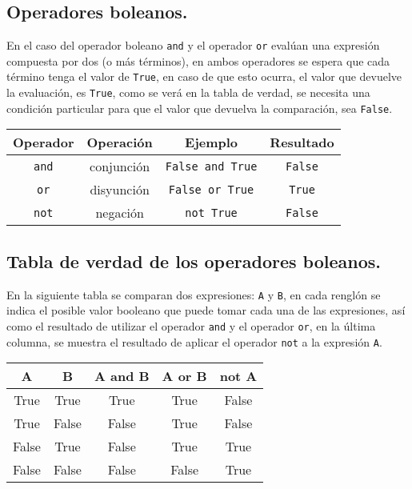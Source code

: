 \documentclass[11pt]{article}
\begin{document}
\subsection{Operadores boleanos.}\label{operadores-boleanos}
En el caso del operador boleano \texttt{and} y el operador \texttt{or} evalúan una expresión compuesta por dos (o más términos), en ambos operadores se espera que cada término tenga el valor de \texttt{True}, en caso de que esto ocurra, el valor que devuelve la evaluación, es \texttt{True}, como se verá en la tabla de verdad, se necesita una condición particular para que el valor que devuelva la
comparación, sea \texttt{False}.
\begin{center}
\begin{tabular}{| c | c | c | c |}
\hline
Operador & Operación & Ejemplo & Resultado \\
\hline
\hline
\texttt{and} & conjunción & \texttt{False and True} & \texttt{False} \\
\texttt{or} & disyunción & \texttt{False or True} & \texttt{True} \\
\texttt{not} & negación & \texttt{not True} & \texttt{False} \\
\hline
\end{tabular}
\end{center}
\subsection{Tabla de verdad de los operadores boleanos.}\label{tabla-de-verdad-de-los-operadores-boleanos}
En la siguiente tabla se comparan dos expresiones: \texttt{A} y \texttt{B}, en cada renglón se indica el posible valor booleano que puede tomar cada una de las expresiones, así como el resultado de utilizar el operador \texttt{and} y el operador \texttt{or}, en la última columna, se muestra el resultado de aplicar el operador \texttt{not} a la expresión \texttt{A}.
\begin{center}
\begin{tabular}{| c | c | c | c | c |}
\hline
A & B & A and B & A or B & not A \\
\hline
\hline
True & True & True & True & False \\
True & False & False & True & False \\
False & True & False & True & True \\
False & False & False & False & True \\
\hline
\end{tabular}
\end{center}
\end{document}

